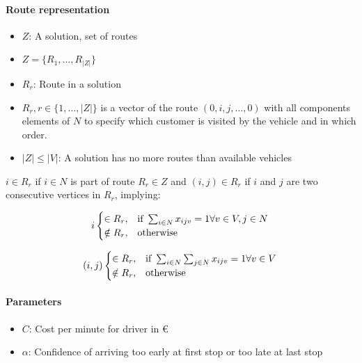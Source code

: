 \documentclass[a4paper,10pt,twoside]{report}
\begin{document}
\paragraph{Route representation}
\begin{itemize}
\item $Z$: A solution, set of routes
\item $Z = \{R_1,\dots,R_{|Z|}\}$
\item $R_r$: Route in a solution
  \item $R_r, r\in \{1,\dots,|Z|\}$ is a vector of the route $(0, i, j,\dots, 0)$ with all components elements of $N$ to specify which customer is visited by the vehicle and in which order. 
\item $|Z|\leq|V|$: A solution has no more routes than available vehicles
\end{itemize}

$i \in R_r$ if $i \in N$ is part of route $R_r \in Z$ and $(i,j) \in R_r$ if $i$ and $j$ are two consecutive vertices in $R_r$, implying:

\begin{equation*}
i
\begin{cases}
\in R_r, & \text{if}\  \sum_{i \in N} x_{ijv} = 1 \forall v \in V, j \in N \\
\notin R_r, & \text{otherwise} \\
\end{cases}\\
\end{equation*}

\begin{equation*}
(i,j)
\begin{cases}
\in R_r, & \text{if}\  \sum_{i \in N} \sum_{j \in N} x_{ijv} = 1 \forall v \in V \\
\notin R_r, & \text{otherwise} \\
\end{cases}\\
\end{equation*}

\paragraph{Parameters}
\begin{itemize}
\item $C$: Cost per minute for driver in \euro
\item $\alpha$: Confidence of arriving too early at first stop or too late at last stop
\end{itemize}
\end{document}
